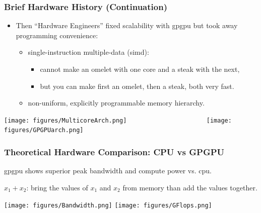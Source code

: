 \documentclass{beamer}
\renewcommand{\emph}[1]{\textcolor{structure}{#1}}
\newcommand{\emp}[1]{\textcolor{DikuRed}{ #1}}
\begin{document}
\begin{frame}
  \frametitle{Brief Hardware History (Continuation)} %
  \centering
 \begin{itemize}
    \item Then ``Hardware Engineers'' fixed \emph{scalability} with \emph{{\sc gpgpu}} but took away \emp{programming convenience}:  \smallskip
        \begin{itemize}
            \item single-instruction multiple-data ({\sc simd}): 
                \begin{itemize}
                    \item cannot make an omelet with one core and a steak with the next,
                    \item but you can make first an omelet, then a steak, both very fast. 
                \end{itemize}\smallskip
            \item non-uniform, explicitly programmable memory hierarchy. 
        \end{itemize}
\end{itemize}

\begin{center} 
\texttt{[image: figures/MulticoreArch.png]}  
$\mbox{ }\mbox{ }\mbox{ }\mbox{ }\mbox{ }\mbox{ }\mbox{ }\mbox{ }\mbox{ }\mbox{ }\mbox{ }\mbox{ }\mbox{ }\mbox{ }\mbox{ }\mbox{ }$ 
\texttt{[image: figures/GPGPUarch.png]}  
\end{center} 

\end{frame}

\begin{frame}
  \frametitle{Theoretical Hardware Comparison: CPU vs GPGPU} %

{\sc gpgpu} shows superior peak bandwidth and compute power vs. {\sc cpu}.  \bigskip

$x_1 + x_2$: bring the values of $x_1$ and $x_2$ from memory than add the values together.


\begin{center} 
\texttt{[image: figures/Bandwidth.png]}  
\texttt{[image: figures/GFlops.png]}
\end{center} 

\end{frame}
\end{document}

